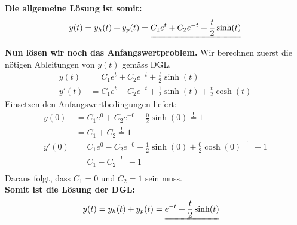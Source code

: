 \textbf{Die allgemeine Lösung ist somit:}
\[
	y(t) = y_h(t) + y_p(t) = \uuline{C_1 e^t + C_2 e^{-t} + \frac{t}{2} \sinh(t)}
\]
\textbf{Nun lösen wir noch das Anfangswertproblem.} Wir berechnen zuerst die nötigen Ableitungen von $y(t)$ gemäss DGL. 
\begin{align*}
	y(t) &= C_1 e^t + C_2 e^{-t} + \frac{t}{2} \sinh(t) \\
	y'(t) &= C_1 e^t - C_2 e^{-t} + \frac{1}{2} \sinh(t) + \frac{t}{2} \cosh(t) 
\end{align*}
Einsetzen den Anfangswertbedingungen liefert:
\begin{align*}
	y(0) &= C_1 e^0 + C_2 e^{-0} + \frac{0}{2} \sinh(0) \overset{!}{=} 1 \\
		 &= C_1 + C_2 \overset{!}{=} 1 \\
	y'(0) &= C_1 e^0 - C_2 e^{-0} + \frac{1}{2} \sinh(0) + \frac{0}{2} \cosh(0)  \overset{!}{=} -1 \\
		  &= C_1 - C_2 \overset{!}{=} -1 \\
\end{align*}
Daraus folgt, dass $C_1 = 0$ und $C_2 = 1$ sein muss. \\
\textbf{Somit ist die Lösung der DGL:}
\begin{align*}
	y(t) &= y_h(t) + y_p(t) = \uuline{e^{-t} + \frac{t}{2} \sinh(t)}
\end{align*}
\newpage